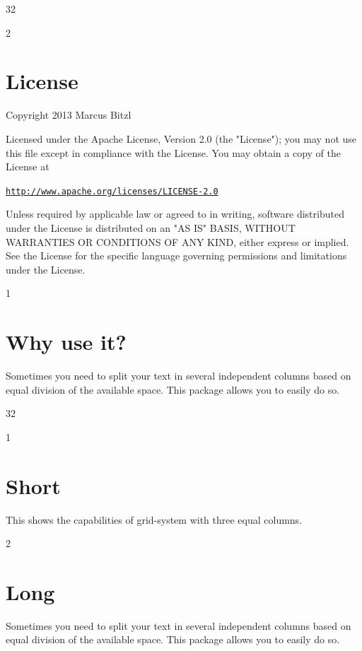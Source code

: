 \documentclass[DIV13,a4paper]{scrartcl}
\begin{document}
\bigskip

\begin{row}[cellsep=0.75cm]{3}{2}
	\begin{cell}{2}
	\section*{License}
	\vspace{-1.5ex}
	Copyright 2013 Marcus Bitzl

	\medskip

	Licensed under the Apache License, Version 2.0 (the "License");
	you may not use this file except in compliance with the License.
	You may obtain a copy of the License at

	\medskip

	\hspace*{1.2em}\href{http://www.apache.org/licenses/LICENSE-2.0}{\texttt{http://www.apache.org/licenses/LICENSE-2.0}}

	\medskip

	Unless required by applicable law or agreed to in writing, software
	distributed under the License is distributed on an "AS IS" BASIS,
	WITHOUT WARRANTIES OR CONDITIONS OF ANY KIND, either express or implied.
	See the License for the specific language governing permissions and
	limitations under the License.
	\end{cell}%
	\begin{cell}{1}
	\section*{Why use it?}
	\vspace{-1.5ex}
	Sometimes you need to split your text in several independent columns based on equal division of the available space. This package allows you to easily do so.
	\end{cell}
\end{row}

\bigskip

\begin{row}[cellsep=0.75cm]{3}{2}
	\begin{cell}{1}
	\section*{Short}
	\vspace{-1.5ex}
	This shows the capabilities of grid-system with three equal columns.
	\end{cell}
	\begin{cell}{2}
	\section*{Long}
	\vspace{-1.5ex}
	Sometimes you need to split your text in several independent columns based on equal division of the available space. This package allows you to easily do so.
	\end{cell}
\end{row}
\end{document}
